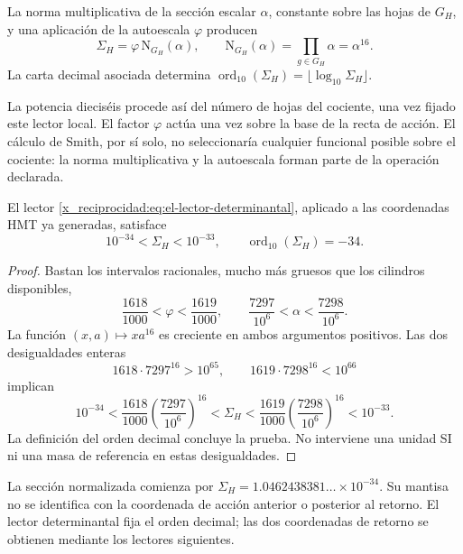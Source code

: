 \begin{definition}
La norma multiplicativa de la sección escalar \(\alpha\), constante
sobre las hojas de \(G_H\), y una aplicación de la autoescala
\(\varphi\) producen
\begin{equation}
 \Sigma_H=\varphi\,\mathrm N_{G_H}(\alpha),\qquad
 \mathrm N_{G_H}(\alpha)=\prod_{g\in G_H}\alpha=\alpha^{16}.
 \label{x_reciprocidad:eq:el-lector-determinantal}
\end{equation}
La carta decimal asociada determina
\(\operatorname{ord}_{10}(\Sigma_H)=\lfloor\log_{10}\Sigma_H\rfloor\).
\end{definition}

La potencia dieciséis procede así del número de hojas del cociente, una
vez fijado este lector local. El factor \(\varphi\) actúa una vez sobre
la base de la recta de acción. El cálculo de Smith, por sí solo, no
seleccionaría cualquier funcional posible sobre el cociente: la norma
multiplicativa y la autoescala forman parte de la operación declarada.

\begin{theorem}
El lector \eqref{x_reciprocidad:eq:el-lector-determinantal}, aplicado a las coordenadas
HMT ya generadas, satisface
\begin{equation}
 10^{-34}<\Sigma_H<10^{-33},\qquad
 \operatorname{ord}_{10}(\Sigma_H)=-34.
 \label{x_reciprocidad:eq:el-decada}
\end{equation}
\end{theorem}
\begin{proof}
Bastan los intervalos racionales, mucho más gruesos que los cilindros
disponibles,
\[
 \frac{1618}{1000}<\varphi<\frac{1619}{1000},\qquad
 \frac{7297}{10^6}<\alpha<\frac{7298}{10^6}.
\]
La función \((x,a)\mapsto xa^{16}\) es creciente en ambos argumentos
positivos. Las dos desigualdades enteras
\[
 1618\cdot7297^{16}>10^{65},\qquad
 1619\cdot7298^{16}<10^{66}
\]
implican
\[
 10^{-34}
 <\frac{1618}{1000}\left(\frac{7297}{10^6}\right)^{16}
 <\Sigma_H
 <\frac{1619}{1000}\left(\frac{7298}{10^6}\right)^{16}
 <10^{-33}.
\]
La definición del orden decimal concluye la prueba. No interviene una
unidad SI ni una masa de referencia en estas desigualdades.
\end{proof}

La sección normalizada comienza por
\(\Sigma_H=1.0462438381\ldots\times10^{-34}\). Su mantisa no se
identifica con la coordenada de acción anterior o posterior al retorno.
El lector determinantal fija el orden decimal; las dos coordenadas de
retorno se obtienen mediante los lectores siguientes.


